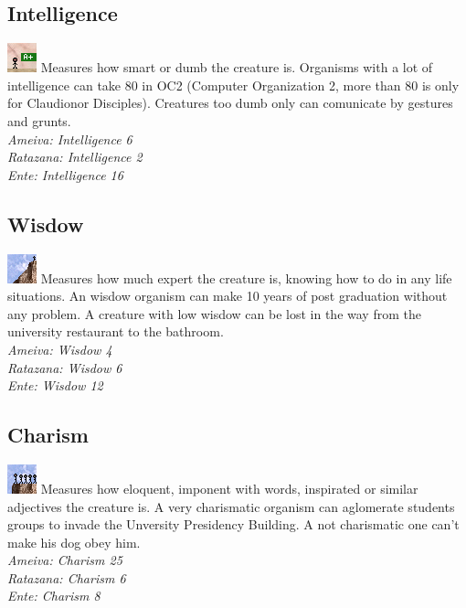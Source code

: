 \documentclass[ letterpaper,12pt]{article}
\begin{document}
\subsection{Intelligence}
\includegraphics{../data/skills/Img/inteligencia.png}
Measures how smart or dumb the creature is. Organisms with a lot of intelligence can take 80 in OC2 (Computer Organization 2, more than 80 is only for Claudionor Disciples). Creatures too dumb only can comunicate by gestures and grunts.\\
{\it Ameiva: Intelligence 6\\
Ratazana: Intelligence 2\\
Ente: Intelligence 16\\}

\subsection{Wisdow}
\includegraphics{../data/skills/Img/sabedoria.png}
Measures how much expert the creature is, knowing how to do in any life situations. An wisdow organism can make 10 years of post graduation without any problem. A creature with low wisdow can be lost in the way from the university restaurant to the bathroom.\\
{\it Ameiva: Wisdow 4\\
Ratazana: Wisdow 6\\
Ente: Wisdow 12}

\subsection{Charism}
\includegraphics{../data/skills/Img/carisma.png}
Measures how eloquent, imponent with words, inspirated or similar adjectives the creature is. A very charismatic organism can aglomerate students groups to invade the Unversity Presidency Building. A not charismatic one can't make his dog obey him.\\
{\it Ameiva: Charism 25\\
Ratazana: Charism 6\\
Ente: Charism 8}
\end{document}
